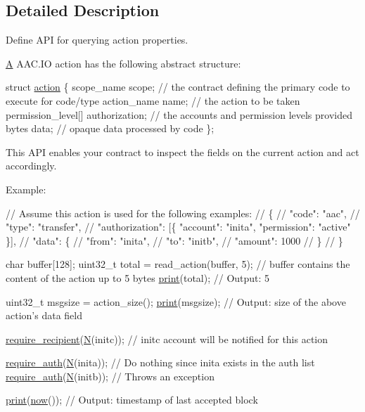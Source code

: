 \subsection{Detailed Description}
Define A\+PI for querying action properties. 

\mbox{\hyperlink{struct_a}{A}} A\+A\+C.\+IO action has the following abstract structure\+:


\begin{DoxyCode}
\textcolor{keyword}{struct }\mbox{\hyperlink{structaction}{action}} \{
  scope\_name scope; \textcolor{comment}{// the contract defining the primary code to execute for code/type}
  action\_name name; \textcolor{comment}{// the action to be taken}
  permission\_level[] authorization; \textcolor{comment}{// the accounts and permission levels provided}
  bytes data; \textcolor{comment}{// opaque data processed by code}
\};
\end{DoxyCode}


This A\+PI enables your contract to inspect the fields on the current action and act accordingly.

Example\+: 
\begin{DoxyCode}
\textcolor{comment}{// Assume this action is used for the following examples:}
\textcolor{comment}{// \{}
\textcolor{comment}{//  "code": "aac",}
\textcolor{comment}{//  "type": "transfer",}
\textcolor{comment}{//  "authorization": [\{ "account": "inita", "permission": "active" \}],}
\textcolor{comment}{//  "data": \{}
\textcolor{comment}{//    "from": "inita",}
\textcolor{comment}{//    "to": "initb",}
\textcolor{comment}{//    "amount": 1000}
\textcolor{comment}{//  \}}
\textcolor{comment}{// \}}

\textcolor{keywordtype}{char} buffer[128];
uint32\_t total = read\_action(buffer, 5); \textcolor{comment}{// buffer contains the content of the action up to 5 bytes}
\mbox{\hyperlink{print_8hpp_a291145c6469a570728575802ed6ad965}{print}}(total); \textcolor{comment}{// Output: 5}

uint32\_t msgsize = action\_size();
\mbox{\hyperlink{print_8hpp_a291145c6469a570728575802ed6ad965}{print}}(msgsize); \textcolor{comment}{// Output: size of the above action's data field}

\mbox{\hyperlink{group__actioncapi_gae232893c733f02b94dbb70fae39d19f7}{require\_recipient}}(\mbox{\hyperlink{group__types_gaf9c1edb0e0da55ec6ba09f32f6839529}{N}}(initc)); \textcolor{comment}{// initc account will be notified for this action}

\mbox{\hyperlink{group__actioncapi_gab1e668e93ac1f94421743ed79edffb26}{require\_auth}}(\mbox{\hyperlink{group__types_gaf9c1edb0e0da55ec6ba09f32f6839529}{N}}(inita)); \textcolor{comment}{// Do nothing since inita exists in the auth list}
\mbox{\hyperlink{group__actioncapi_gab1e668e93ac1f94421743ed79edffb26}{require\_auth}}(\mbox{\hyperlink{group__types_gaf9c1edb0e0da55ec6ba09f32f6839529}{N}}(initb)); \textcolor{comment}{// Throws an exception}

\mbox{\hyperlink{print_8hpp_a291145c6469a570728575802ed6ad965}{print}}(\mbox{\hyperlink{group__systemcapi_ga5eef43c9589d6ef54a0ece1dda5e0ffe}{now}}()); \textcolor{comment}{// Output: timestamp of last accepted block}
\end{DoxyCode}
 

